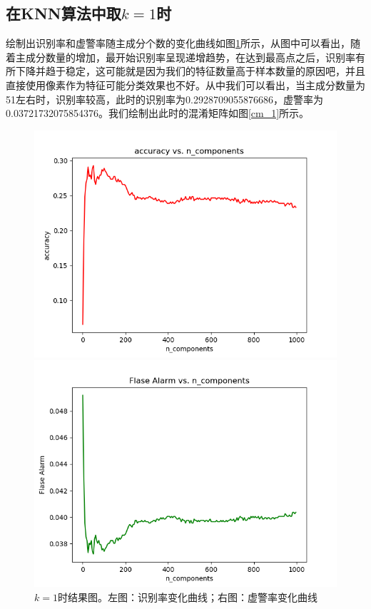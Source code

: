 \documentclass[cn]{elegantbook}
\begin{document}
\subsection{在KNN算法中取$k=1$时}
绘制出识别率和虚警率随主成分个数的变化曲线如图\ref{knn_res_1}所示，从图中可以看出，随着主成分数量的增加，最开始识别率呈现递增趋势，在达到最高点之后，识别率有所下降并趋于稳定，这可能就是因为我们的特征数量高于样本数量的原因吧，并且直接使用像素作为特征可能分类效果也不好。从中我们可以看出，当主成分数量为51左右时，识别率较高，此时的识别率为0.2928709055876686，虚警率为0.03721732075854376。我们绘制出此时的混淆矩阵如图\ref{cm_1}所示。

\begin{figure}[!h]
	\centering
	\begin{minipage}[t]{0.48\textwidth}
		\centering
		\includegraphics[width=\textwidth]{../results/acc_n_1}
	\end{minipage}
	\begin{minipage}[t]{0.48\textwidth}
		\centering
		\includegraphics[width=\textwidth]{../results/falseAlarm_n_1}
	\end{minipage}
	\caption{\label{knn_res_1}$k=1$时结果图。左图：识别率变化曲线；右图：虚警率变化曲线}
\end{figure}
\end{document}

